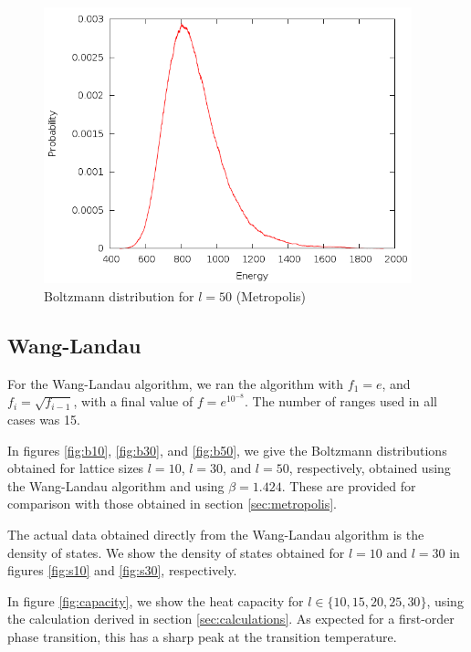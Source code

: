 \documentclass{article}
\begin{document}
\begin{figure}[h]
\includegraphics[height=8cm]{../results/metropolis/m50.png}
\caption{Boltzmann distribution for $l = 50$ (Metropolis)}
\label{fig:m50}
\end{figure}

\subsection{Wang-Landau}
For the Wang-Landau algorithm, we ran the algorithm with $f_1 = e$, and $f_i = \sqrt{f_{i-1}}$, with a final value of $f = e^{10^{-8}}$.
The number of ranges used in all cases was 15.

In figures \ref{fig:b10}, \ref{fig:b30}, and \ref{fig:b50}, we give the Boltzmann distributions obtained for lattice sizes $l = 10$, $l = 30$, and $l = 50$, respectively, obtained using the Wang-Landau algorithm and using $\beta = 1.424$.
These are provided for comparison with those obtained in section \ref{sec:metropolis}.

The actual data obtained directly from the Wang-Landau algorithm is the density of states.
We show the density of states obtained for $l = 10$ and $l = 30$ in figures \ref{fig:s10} and \ref{fig:s30}, respectively.

In figure \ref{fig:capacity}, we show the heat capacity for $l \in\{10,15,20,25,30\}$, using the calculation derived in section \ref{sec:calculations}.
As expected for a first-order phase transition, this has a sharp peak at the transition temperature.
\end{document}
